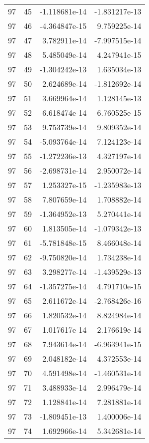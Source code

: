 \begin{tabular}{rrrr}
  97 &   45 & -1.118681e-14 & -1.831217e-13 \\
  97 &   46 & -4.364847e-15 &  9.759225e-14 \\
  97 &   47 &  3.782911e-14 & -7.997515e-14 \\
  97 &   48 &  5.485049e-14 &  4.247941e-15 \\
  97 &   49 & -1.304242e-13 &  1.635034e-13 \\
  97 &   50 &  2.624689e-14 & -1.812692e-14 \\
  97 &   51 &  3.669964e-14 &  1.128145e-13 \\
  97 &   52 & -6.618474e-14 & -6.760525e-15 \\
  97 &   53 &  9.753739e-14 &  9.809352e-14 \\
  97 &   54 & -5.093764e-14 &  7.124123e-14 \\
  97 &   55 & -1.272236e-13 &  4.327197e-14 \\
  97 &   56 & -2.698731e-14 &  2.950072e-14 \\
  97 &   57 &  1.253327e-15 & -1.235983e-13 \\
  97 &   58 &  7.807659e-14 &  1.708882e-14 \\
  97 &   59 & -1.364952e-13 &  5.270441e-14 \\
  97 &   60 &  1.813505e-14 & -1.079342e-13 \\
  97 &   61 & -5.781848e-15 &  8.466048e-14 \\
  97 &   62 & -9.750820e-14 &  1.734238e-14 \\
  97 &   63 &  3.298277e-14 & -1.439529e-13 \\
  97 &   64 & -1.357275e-14 &  4.791710e-15 \\
  97 &   65 &  2.611672e-14 & -2.768426e-16 \\
  97 &   66 &  1.820532e-14 &  8.824984e-14 \\
  97 &   67 &  1.017617e-14 &  2.176619e-14 \\
  97 &   68 &  7.943614e-14 & -6.963941e-15 \\
  97 &   69 &  2.048182e-14 &  4.372553e-14 \\
  97 &   70 &  4.591498e-14 & -1.460531e-14 \\
  97 &   71 &  3.488933e-14 &  2.996479e-14 \\
  97 &   72 &  1.128841e-14 &  7.281881e-14 \\
  97 &   73 & -1.809451e-13 &  1.400006e-14 \\
  97 &   74 &  1.692966e-14 &  5.342681e-14 \\

\end{tabular}

